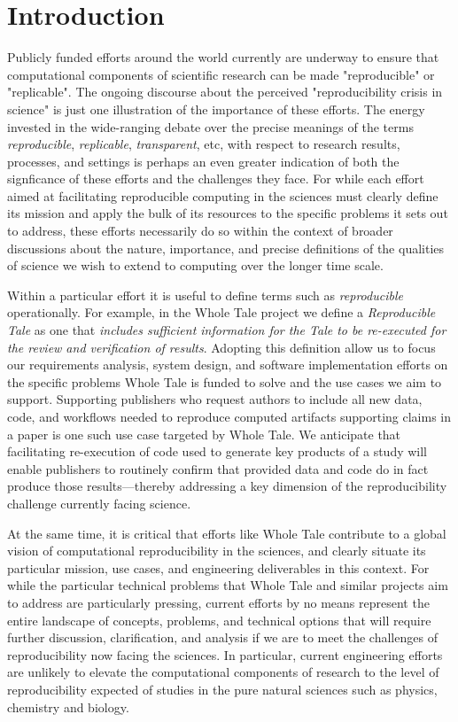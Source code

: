 
\section{Introduction}

Publicly funded efforts around the world currently are underway to 
	ensure that computational components of scientific research
	can be made "reproducible" or "replicable".
The ongoing discourse about the perceived "reproducibility crisis in science"
	is just one illustration of the importance of these efforts.
The energy invested in the wide-ranging debate over the precise meanings of the 
	terms \emph{reproducible}, \emph{replicable}, \emph{transparent}, etc, with 
	respect to research results, processes, and settings is perhaps an even greater indication of 
	both the signficance of these efforts and the challenges they face.
For while each effort aimed at facilitating reproducible computing in the
	sciences must clearly define its mission and apply the bulk of its resources
	to the specific problems it sets out to address, these efforts necessarily do
	so within the context of broader discussions about the nature, importance,
	and precise definitions of the qualities of science we wish to extend to computing
	over the longer time scale.

Within a particular effort it is useful to define terms such as \emph{reproducible} operationally.
For example, in the Whole Tale project we define a \emph{Reproducible Tale} as one 
	that \emph{includes sufficient information for the Tale to be re-executed for the review 
	and verification of results}.
Adopting this definition allow us to focus our requirements analysis, system design,
	and software implementation efforts on the specific problems Whole Tale is funded to solve
	and the use cases we aim to support.
Supporting publishers who request authors to include all new data, 
	code, and workflows needed to reproduce computed artifacts supporting
	claims in a paper is one such use case targeted by Whole Tale.
We anticipate that facilitating re-execution of code used to generate
	key products of a study will enable publishers to routinely confirm that
	provided data and code do in fact produce those results---thereby addressing
	a key dimension of the reproducibility challenge currently facing science.

At the same time, it is critical that efforts like Whole Tale contribute to a global 
	vision of computational reproducibility in the sciences, and clearly situate 
	its particular mission, use cases, and engineering deliverables in this context.
For while the particular technical problems that Whole Tale and similar projects
	aim to address are particularly pressing, current efforts by no means
	represent the entire landscape of concepts, problems, and technical options
	that will require further discussion, clarification, and analysis if we are to meet
	the challenges of reproducibility now facing the sciences.
In particular, current engineering efforts are unlikely to elevate the computational components
	of research to the level of reproducibility expected of studies in the
	pure natural sciences such as physics, chemistry and biology.

